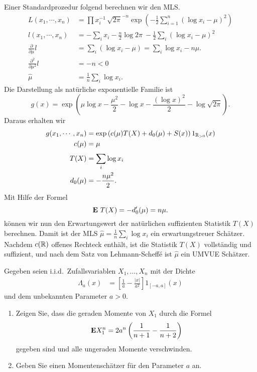 \solution Einer Standardprozedur folgend berechnen wir den MLS. 
\begin{align*}
    L(x_1, \cdots, x_n) &= \prod x_i^{-1} \, \sqrt{2 \pi}^{-n} 
    \exp \left( - \frac{1}{2} \sum_{i=1}^{n} \left( \log x_i - \mu \right)^2 \right) \\
    l(x_1, \cdots, x_n) &= - \sum_{i}^{} x_i - \frac{n}{2} \log 2\pi \ -\frac{1}{2} \sum_{i}^{} \left( \log x_i -\mu \right)^2 \\
    \frac{\partial}{\partial \mu} l &= \sum_{i}^{} \left( \log x_i -\mu \right) = \sum_{i}^{} \log x_i - n\mu. \\
    \frac{\partial^2}{\partial \mu^2} l &= -n <0 \\
    \hat \mu &= \frac{1}{n} \sum_{i}^{} \log x_i.
\end{align*}
Die Darstellung als natürliche exponentielle Familie ist
\begin{equation*}
    g(x) = \exp \left( \mu \log x - \frac{\mu^2}{2} - \log x - \frac{\left( \log x \right)^2}{2} - \log \sqrt{2\pi} \right).
\end{equation*}
Daraus erhalten wir
\begin{align*}
    g(x_1, \cdots, x_n) &= \exp \left( c(\mu) T(X) + d_0 (\mu) + S(x) \right) 1_{\mathbb R_{>0}}(x) \\
    c(\mu) &= \mu \\
    T(X) &= \sum_{i}^{} \log x_i \\
    d_0(\mu) &= - \frac{n \mu^2}{2}.
\end{align*}
Mit Hilfe der Formel 
\begin{equation*}
    \mathbf{E}\ T(X) = - d_0'(\mu) = n \mu. 
\end{equation*}
können wir nun den Erwartungswert der natürlichen suffizienten Statistik $T(X)$
berechnen.  Damit ist der MLS $\hat \mu = \frac{1}{n} \sum_{i}^{} \log x_i$ ein
erwartungstreuer Schätzer. Nachdem $c(\mathbb R)$ offenes Rechteck enthält, ist die
Statistik $T(X)$ vollständig und suffizient, und nach dem Satz von
Lehmann-Scheff\'e ist $\hat \mu$ ein UMVUE Schätzer. 





 Gegeben seien
i.i.d.\ Zufallsvariablen $X_1,\ldots, X_n$ mit der Dichte 
\begin{align*}
    \Lambda_a(x) &= \left[ \frac{1}{a} - \frac{|x|}{a^2} \right] 1_{[-a,a]}(x)
\end{align*}
und dem unbekannten Parameter $a>0$. 
\begin{enumerate}
    \item Zeigen Sie, dass die geraden Momente von $X_1$ durch die Formel
        \begin{equation*}
            \mathbf{E} X_1^n = 2 a^n \left( \frac{1}{n+1} - \frac{1}{n+2} \right)
        \end{equation*}
        gegeben sind und alle ungeraden Momente verschwinden. 
    \item Geben Sie einen Momentenschätzer für den Parameter $a$ an.
\end{enumerate}

